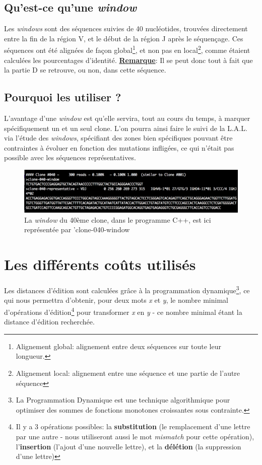 \documentclass[pdftex,12pt,a4paper]{report}
\begin{document}
\begin{spacing}{1.2}
\subsection{Qu'est-ce qu'une \textit{window}}

Les \textit{windows} sont des séquences suivies de 40 nucléotides, trouvées directement entre la fin de la région V, et le début de la région J après le séquençage. Ces séquences ont été alignées de façon global\footnote{Alignement global: alignement entre deux séquences sur toute leur longueur.}, et non pas en local\footnote{Alignement local: alignement entre une séquence et une partie de l'autre séquence}, comme étaient calculées les pourcentages d'identité.
\newline
\underline{\textbf{Remarque}}: Il se peut donc tout à fait que la partie D se retrouve, ou non, dans cette séquence.

\subsection{Pourquoi les utiliser ?}

L'avantage d'une \textit{window} est qu'elle servira, tout au cours du temps, à marquer spécifiquement un et un seul clone. L'on pourra ainsi faire le suivi de la L.A.L. via l'étude des \textit{windows}, spécifiant des zones bien spécifiques pouvant être contraintes à évoluer en fonction des mutations infligées, ce qui n'était pas possible avec les séquences représentatives.

\begin{figure}[H]
\begin{center}
	\includegraphics[scale=0.6]{img/C++-window.jpg}
\end{center}
\caption{La \textit{window} du 40ème clone, dans le programme C++, est ici représentée par 'clone-040-window}
\end{figure}

\section{Les différents coûts utilisés}

Les distances d'édition sont calculées grâce à la programmation dynamique\footnote{La Programmation Dynamique est une technique algorithmique pour optimiser des sommes de fonctions monotones croissantes sous contrainte.}, ce qui nous permettra d'obtenir, pour deux mots \textit{x} et \textit{y}, le nombre minimal d’opérations d’édition\footnote{Il y a 3 opérations possibles: la \textbf{substitution} (le remplacement d'une lettre par une autre - nous utiliseront aussi le mot \textit{mismatch} pour cette opération), l'\textbf{insertion} (l'ajout d'une nouvelle lettre), et la \textbf{délétion} (la suppression d'une lettre)} pour transformer \textit{x} en \textit{y} - ce nombre minimal étant la distance d'édition recherchée.


\end{spacing}
\end{document}
